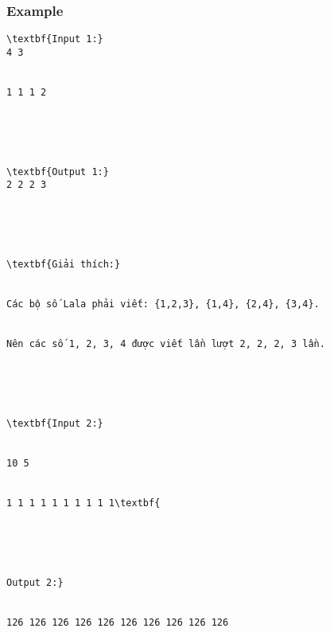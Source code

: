 \subsubsection{   Example  }
\begin{verbatim}
\textbf{Input 1:}
4 3


1 1 1 2





\textbf{Output 1:}
2 2 2 3 





\textbf{Giải thích:}


Các bộ số Lala phải viết: {1,2,3}, {1,4}, {2,4}, {3,4}. 


Nên các số 1, 2, 3, 4 được viết lần lượt 2, 2, 2, 3 lần.





\textbf{Input 2:}


10 5


1 1 1 1 1 1 1 1 1 1\textbf{





Output 2:}


126 126 126 126 126 126 126 126 126 126 \end{verbatim}
